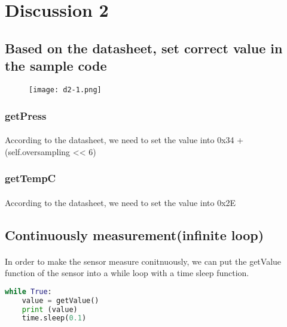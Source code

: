 \section{Discussion 2}
\subsection{Based on the datasheet, set correct value in the sample code}
\begin{figure}[!h]
    \begin{center}
        \texttt{[image: d2-1.png]}
    \end{center}
\end{figure}
\subsubsection{getPress}
\paragraph{}
According to the datasheet, we need to set the value into 0x34 + (self.oversampling << 6)
\subsubsection{getTempC}
\paragraph{}
According to the datasheet, we need to set the value into 0x2E
\subsection{Continuously measurement(infinite loop)}
\paragraph{}
In order to make the sensor measure conitnuously, we can put the getValue function of the sensor into a while loop with a time sleep function.
\begin{lstlisting}[language=Python]
while True:
    value = getValue()
    print (value)
    time.sleep(0.1)
\end{lstlisting}
